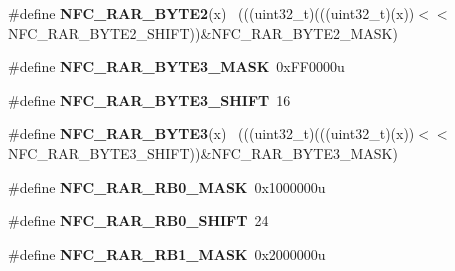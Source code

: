 \begin{DoxyCompactItemize}
\item 
\hypertarget{group___n_f_c___register___masks_ga01264ae6a2fa3e8a3c92e67b8f629d3e}{}\#define {\bfseries N\+F\+C\+\_\+\+R\+A\+R\+\_\+\+B\+Y\+T\+E2}(x)                                              ~(((uint32\+\_\+t)(((uint32\+\_\+t)(x))$<$$<$N\+F\+C\+\_\+\+R\+A\+R\+\_\+\+B\+Y\+T\+E2\+\_\+\+S\+H\+I\+F\+T))\&N\+F\+C\+\_\+\+R\+A\+R\+\_\+\+B\+Y\+T\+E2\+\_\+\+M\+A\+S\+K)\label{group___n_f_c___register___masks_ga01264ae6a2fa3e8a3c92e67b8f629d3e}

\item 
\hypertarget{group___n_f_c___register___masks_ga647783e5832bb200619c39dac17612b6}{}\#define {\bfseries N\+F\+C\+\_\+\+R\+A\+R\+\_\+\+B\+Y\+T\+E3\+\_\+\+M\+A\+S\+K}~0x\+F\+F0000u\label{group___n_f_c___register___masks_ga647783e5832bb200619c39dac17612b6}

\item 
\hypertarget{group___n_f_c___register___masks_ga9eea9c4748eb813a5313f8de176ce83d}{}\#define {\bfseries N\+F\+C\+\_\+\+R\+A\+R\+\_\+\+B\+Y\+T\+E3\+\_\+\+S\+H\+I\+F\+T}~16\label{group___n_f_c___register___masks_ga9eea9c4748eb813a5313f8de176ce83d}

\item 
\hypertarget{group___n_f_c___register___masks_ga1ddae6bc7ff066cad52538b45dc760b7}{}\#define {\bfseries N\+F\+C\+\_\+\+R\+A\+R\+\_\+\+B\+Y\+T\+E3}(x)                                              ~(((uint32\+\_\+t)(((uint32\+\_\+t)(x))$<$$<$N\+F\+C\+\_\+\+R\+A\+R\+\_\+\+B\+Y\+T\+E3\+\_\+\+S\+H\+I\+F\+T))\&N\+F\+C\+\_\+\+R\+A\+R\+\_\+\+B\+Y\+T\+E3\+\_\+\+M\+A\+S\+K)\label{group___n_f_c___register___masks_ga1ddae6bc7ff066cad52538b45dc760b7}

\item 
\hypertarget{group___n_f_c___register___masks_gae7af8bf7604b18ee83bbc9fc338b7576}{}\#define {\bfseries N\+F\+C\+\_\+\+R\+A\+R\+\_\+\+R\+B0\+\_\+\+M\+A\+S\+K}~0x1000000u\label{group___n_f_c___register___masks_gae7af8bf7604b18ee83bbc9fc338b7576}

\item 
\hypertarget{group___n_f_c___register___masks_ga50040ed8ac5659fc523af1b453e5af9b}{}\#define {\bfseries N\+F\+C\+\_\+\+R\+A\+R\+\_\+\+R\+B0\+\_\+\+S\+H\+I\+F\+T}~24\label{group___n_f_c___register___masks_ga50040ed8ac5659fc523af1b453e5af9b}

\item 
\hypertarget{group___n_f_c___register___masks_ga9eb3377ede1f038099eb5f6f93a64097}{}\#define {\bfseries N\+F\+C\+\_\+\+R\+A\+R\+\_\+\+R\+B1\+\_\+\+M\+A\+S\+K}~0x2000000u\label{group___n_f_c___register___masks_ga9eb3377ede1f038099eb5f6f93a64097}


\end{DoxyCompactItemize}
